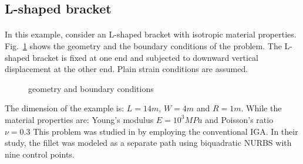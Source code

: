 \subsection{L-shaped bracket}
\label{subsection:l_shaped_bracket}
\paragraph{}
In this example, consider an L-shaped bracket with isotropic material properties.
Fig.~\ref{iso_fig:l_with_fillet_geo_bc} shows the geometry and the boundary conditions of the problem.
The L-shaped bracket is fixed at one end and subjected to downward vertical displacement at the other end.
Plain strain conditions are assumed.
    \begin{figure}[h!]
        \centering
        \caption{geometry and boundary conditions} 
        \label{iso_fig:l_with_fillet_geo_bc}         
    \end{figure}

The dimension of the example is: $L=14m$, $W=4m$ and $R=1m$.
While the material properties are: Young's modulus $E=10^3MPa$ and Poisson's ratio $\nu=0.3$
This problem was studied in \cite{LIPTON2010357} by employing the conventional IGA.
In their study, the fillet was modeled as a separate path using biquadratic NURBS with nine control points.


